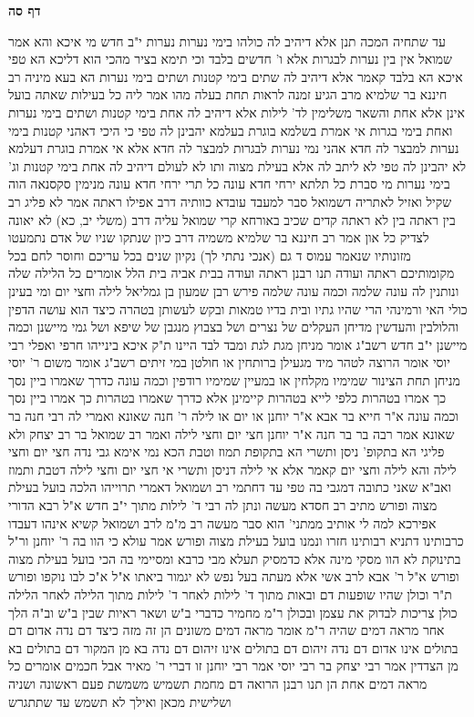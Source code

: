 \documentclass[12pt, openany]{book}
\newcommand{\sethebfont}{
\fontsize{10.5pt}{21.0pt} \selectfont
}
\newcommand{\twocol}[1]{
	{\sethebfont \begin{multicols}{2}
			#1
	\end{multicols}}	
}
\newcommand{\sectname}{}
\newcommand{\newsection}[1]{
	\addcontentsline{toc}{section}{#1}
	\renewcommand{\sectname}{#1}	
	\vspace{-\baselineskip}
	\begin{center}
		\textbf{%
\fontsize{16pt}{16pt}\selectfont
			#1}
	\end{center}
	\vspace{-\baselineskip}
	\nopagebreak
}
\begin{document}
\newsection{דף סה}
\twocol{עד שתחיה המכה תנן 
אלא דיהיב לה כולהו בימי נערות נערות י"ב חדש מי איכא  והא אמר שמואל  אין בין נערות לבגרות אלא ו' חדשים בלבד  וכי תימא  בציר מהכי הוא דליכא הא טפי איכא הא בלבד קאמר 
אלא דיהיב לה שתים בימי קטנות ושתים בימי נערות הא בעא מיניה רב חיננא בר שלמיא מרב  הגיע זמנה לראות תחת בעלה מהו 
אמר ליה  כל בעילות שאתה בועל אינן אלא אחת והשאר משלימין לד' לילות 
אלא  דיהיב לה אחת בימי קטנות ושתים בימי נערות ואחת בימי בגרות אי אמרת בשלמא בוגרת בעלמא יהבינן לה טפי כי היכי דאהני קטנות בימי נערות למבצר לה חדא אהני נמי נערות לבגרות למבצר לה חדא 
אלא אי אמרת בוגרת דעלמא לא יהבינן לה טפי לא ליתב לה אלא בעילת מצוה ותו לא 
לעולם דיהיב לה אחת בימי קטנות וג' בימי נערות מי סברת כל תלתא ירחי חדא עונה  כל תרי ירחי חדא עונה 
מנימין סקסנאה הוה שקיל ואזיל לאתריה דשמואל סבר למעבד עובדא כוותיה דרב אפילו ראתה  אמר  לא פליג רב בין ראתה בין לא ראתה 
קדים שכיב באורחא  קרי שמואל עליה דרב  (משלי יב, כא) לא יאונה לצדיק כל און 
אמר רב חיננא בר שלמיא משמיה דרב  כיון שנתקו שניו של אדם נתמעטו מזונותיו שנאמר  {עמוס ד } גם (אנכי נתתי לך) נקיון שנים בכל עריכם וחוסר לחם בכל מקומותיכם
ראתה ועודה תנו רבנן ראתה ועודה בבית אביה בית הלל אומרים  כל הלילה שלה ונותנין לה עונה שלמה  וכמה עונה שלמה  פירש רבן שמעון בן גמליאל  לילה וחצי יום 
ומי בעינן כולי האי  ורמינהי  הרי שהיו גתיו ובית בדיו טמאות ובקש לעשותן בטהרה כיצד הוא עושה הדפין והלולבין והעדשין מדיחן
העקלים של נצרים ושל בצבוץ מנגבן של שיפא ושל גמי מיישנן  וכמה מיישנן  י"ב חדש  רשב"ג אומר מניחן מגת לגת ומבד לבד 
היינו ת"ק  איכא בינייהו חרפי ואפלי 
רבי יוסי אומר הרוצה לטהר מיד מגעילן ברותחין או חולטן במי זיתים  רשב"ג אומר משום ר' יוסי  מניחן תחת הצינור שמימיו מקלחין או במעיין שמימיו רודפין  וכמה  עונה  כדרך שאמרו ביין נסך כך אמרו בטהרות 
כלפי לייא  בטהרות קיימינן  אלא  כדרך שאמרו בטהרות כך אמרו ביין נסך 
וכמה עונה  א"ר חייא בר אבא א"ר יוחנן  או יום או לילה  ר' חנה שאונא ואמרי לה רבי חנה בר שאונא אמר רבה בר בר חנה א"ר יוחנן  חצי יום וחצי לילה 
ואמר רב שמואל בר רב יצחק  ולא פליגי הא בתקופ' ניסן ותשרי הא בתקופת תמוז וטבת 
הכא נמי אימא גבי נדה  חצי יום וחצי לילה  והא לילה וחצי יום קאמר  אלא  אי לילה דניסן ותשרי אי חצי יום וחצי לילה דטבת ותמוז 
ואב"א  שאני כתובה  דמגבי בה טפי עד דחתמי 
רב ושמואל דאמרי תרוייהו  הלכה בועל בעילת מצוה ופורש 
מתיב רב חסדא  מעשה ונתן לה רבי ד' לילות מתוך י"ב חדש 
א"ל רבא  הדורי אפירכא למה לי  אותיב ממתני'  הוא סבר מעשה רב 
מ"מ לרב ושמואל קשיא  אינהו דעבדו כרבותינו  דתניא רבותינו חזרו ונמנו  בועל בעילת מצוה ופורש 
אמר עולא  כי הוו בה ר' יוחנן ור"ל בתינוקת לא הוו מסקי מינה אלא כדמסיק תעלא מבי כרבא ומסיימי בה הכי  בועל בעילת מצוה ופורש 
א"ל ר' אבא לרב אשי  אלא מעתה בעל נפש לא יגמור ביאתו  א"ל  א"כ לבו נוקפו ופורש 
ת"ר  וכולן שהיו שופעות דם ובאות מתוך ד' לילות לאחר ד' לילות מתוך הלילה לאחר הלילה כולן צריכות לבדוק את עצמן 
ובכולן ר"מ מחמיר כדברי ב"ש 
ושאר ראיות שבין ב"ש וב"ה הלך אחר מראה דמים 
שהיה ר"מ אומר  מראה דמים משונים הן זה מזה  כיצד  דם נדה אדום דם בתולים אינו אדום  דם נדה זיהום דם בתולים אינו זיהום  דם נדה בא מן המקור דם בתולים בא מן הצדדין 
אמר רבי יצחק בר רבי יוסי אמר רבי יוחנן  זו דברי ר' מאיר אבל חכמים אומרים כל מראה דמים אחת הן 
תנו רבנן  הרואה דם מחמת תשמיש משמשת פעם ראשונה ושניה ושלישית  מכאן ואילך לא תשמש עד שתתגרש}
\end{document}
